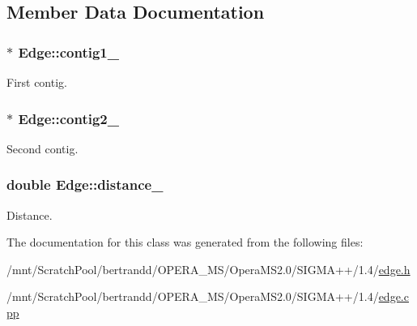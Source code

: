 \subsection{Member Data Documentation}
\hypertarget{classEdge_abb45d873178999a3900766ce2f5171e1}{
\subsubsection[{contig1\_\-}]{$\ast$ {\bf Edge::contig1\_\-}}}
\label{classEdge_abb45d873178999a3900766ce2f5171e1}
First contig. \hypertarget{classEdge_a0ec4fe4c2a08117dd32614363aabf11b}{
\subsubsection[{contig2\_\-}]{$\ast$ {\bf Edge::contig2\_\-}}}
\label{classEdge_a0ec4fe4c2a08117dd32614363aabf11b}
Second contig. \hypertarget{classEdge_aa8b19d16fae843b064205c9da447bf56}{
\subsubsection[{distance\_\-}]{\setlength{\rightskip}{0pt plus 5cm}double {\bf Edge::distance\_\-}}}
\label{classEdge_aa8b19d16fae843b064205c9da447bf56}
Distance. 

The documentation for this class was generated from the following files:\begin{DoxyCompactItemize}
\item 
/mnt/ScratchPool/bertrandd/OPERA\_\-MS/OperaMS2.0/SIGMA++/1.4/\hyperlink{edge_8h}{edge.h}\item 
/mnt/ScratchPool/bertrandd/OPERA\_\-MS/OperaMS2.0/SIGMA++/1.4/\hyperlink{edge_8cpp}{edge.cpp}\end{DoxyCompactItemize}
